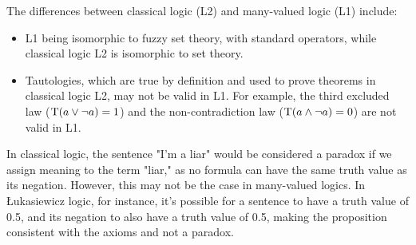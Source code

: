\documentclass[12pt, a4paper]{report}
\begin{document}
    The differences between classical logic (L2) and many-valued logic (L1) include:
    \begin{itemize}
        \item L1 being isomorphic to fuzzy set theory, with standard operators, while classical logic L2 is isomorphic to set theory.
        \item Tautologies, which are true by definition and used to prove theorems in classical logic L2, may not be valid in L1. 
            For example, the third excluded law ($\textnormal{T}(a \lor \lnot a)=1$) and the non-contradiction law ($\textnormal{T}(a \land \lnot a)=0$) are not valid in L1.
    \end{itemize}
    In classical logic, the sentence "I'm a liar" would be considered a paradox if we assign meaning to the term "liar," as no formula can have the same truth value as its negation. 
    However, this may not be the case in many-valued logics. In Łukasiewicz logic, for instance, it's possible for a sentence to have a truth value of 0.5, and its negation to also have a truth value of 0.5, making the proposition consistent with the axioms and not a paradox.
\end{document}
